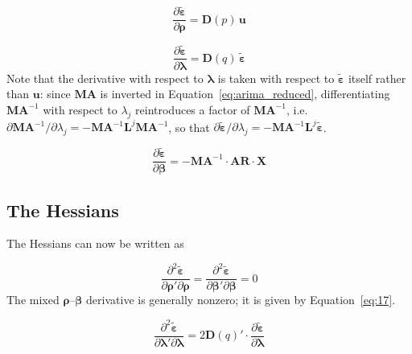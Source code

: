 \documentclass[12pt]{article}
\begin{document}
\begin{equation}
\frac{\partial \tilde{\boldsymbol{\varepsilon}}}{\partial \boldsymbol{\rho}}
= \mathbf{D}(p) \, \mathbf{u}
\label{eq:11}
\end{equation}

\begin{equation}
\frac{\partial \tilde{\boldsymbol{\varepsilon}}}{\partial \boldsymbol{\lambda}}
= \mathbf{D}(q) \, \tilde{\boldsymbol{\varepsilon}}
\label{eq:12}
\end{equation}
Note that the derivative with respect to $\boldsymbol{\lambda}$ is taken with respect to $\tilde{\boldsymbol{\varepsilon}}$ itself rather than $\mathbf{u}$: since $\mathbf{MA}$ is inverted in Equation~\ref{eq:arima_reduced}, differentiating $\mathbf{MA}^{-1}$ with respect to $\lambda_j$ reintroduces a factor of $\mathbf{MA}^{-1}$, i.e.\ $\partial \mathbf{MA}^{-1}/\partial \lambda_j = -\mathbf{MA}^{-1}\mathbf{L}^{j}\mathbf{MA}^{-1}$, so that $\partial \tilde{\boldsymbol{\varepsilon}}/\partial \lambda_j = -\mathbf{MA}^{-1}\mathbf{L}^{j}\tilde{\boldsymbol{\varepsilon}}$.


\begin{equation}
\frac{\partial \tilde{\boldsymbol{\varepsilon}}}{\partial \boldsymbol{\beta}}
= - \mathbf{MA}^{-1} \cdot \mathbf{AR} \cdot \mathbf{X}
\label{eq:13}
\end{equation}

\subsection{The Hessians}

The Hessians can now be written as

\begin{equation}
\frac{\partial^{2} \tilde{\boldsymbol{\varepsilon}}}{\partial \boldsymbol{\rho}' \partial \boldsymbol{\rho}}=
\frac{\partial^{2} \tilde{\boldsymbol{\varepsilon}}}{\partial \boldsymbol{\beta}' \partial \boldsymbol{\beta}}
= 0
\label{eq:14}
\end{equation}
The mixed $\boldsymbol{\rho}$--$\boldsymbol{\beta}$ derivative is generally nonzero; it is given by Equation~\ref{eq:17}.

\begin{equation}
\frac{\partial^{2} \tilde{\boldsymbol{\varepsilon}}}{\partial \boldsymbol{\lambda}' \partial \boldsymbol{\lambda}}
= 2  \mathbf{D}(q)' \cdot \frac{\partial \tilde{\boldsymbol{\varepsilon}}}{\partial \boldsymbol{\lambda}}
\label{eq:15}
\end{equation}
\end{document}
